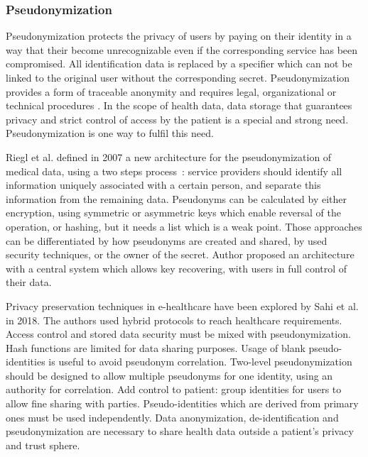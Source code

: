 \subsubsection{Pseudonymization}
\label{subsubsec:state_review_results_pseudonymization}

Pseudonymization protects the privacy of users by paying on their identity in a way that their become unrecognizable even if the corresponding service has been compromised. All identification data is replaced by a specifier which can not be linked to the original user without the corresponding secret. Pseudonymization provides a form of traceable anonymity and requires legal, organizational or technical procedures \cite{riedl_secure_2007}. In the scope of health data, data storage that guarantees privacy and strict control of access by the patient is a special and strong need. Pseudonymization is one way to fulfil this need.

Riegl et al. defined in 2007 a new architecture for the pseudonymization of medical data, using a two steps process~\cite{riedl_secure_2007}: service providers should identify all information uniquely associated with a certain person, and separate this information from the remaining data. Pseudonyms can be calculated by either encryption, using symmetric or asymmetric keys which enable reversal of the operation, or hashing, but it needs a list which is a weak point. Those approaches can be differentiated by how pseudonyms are created and shared, by used security techniques, or the owner of the secret. Author proposed an architecture with a central system which allows key recovering, with users in full control of their data. %

Privacy preservation techniques in e-healthcare have been explored by Sahi et al.~\cite{sahi_privacy_2018} in 2018. The authors used hybrid protocols to reach healthcare requirements. Access control and stored data security must be mixed with pseudonymization. Hash functions are limited for data sharing purposes. Usage of blank pseudo-identities is useful to avoid pseudonym correlation. Two-level pseudonymization should be designed to allow multiple pseudonyms for one identity, using an authority for correlation. Add control to patient: group identities for users to allow fine sharing with parties. Pseudo-identities which are derived from primary ones must be used independently. Data anonymization, de-identification and pseudonymization are necessary to share health data outside a patient's privacy and trust sphere. %

